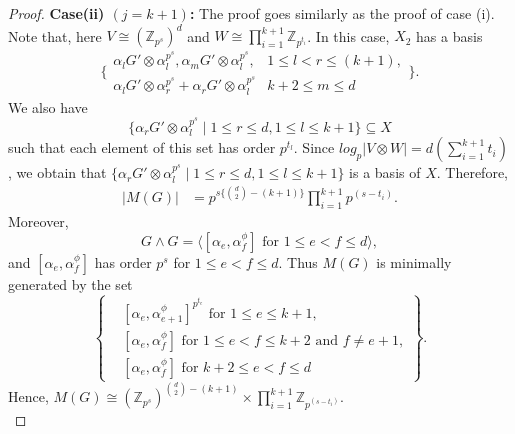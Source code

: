\documentclass[preprint,sort&compress,12pt]{elsarticle}
\numberwithin{equation}{section}
\theoremstyle{definition}
\newcommand{\Z}{\mathbb{Z}}
\begin{document}
\begin{proof}
\textbf{Case(ii) $(j=k+1)$:} The proof goes similarly as the proof of case (i). Note that, here $V \cong (\Z_{p^s})^d$ and $W \cong  \prod\limits_{i=1}^{k+1}\Z_{p^{t_i}}$. In this case, $X_2$ has a basis 
\[ \biggl\{ 
\begin{array}{l|cl}
\alpha_ l G' \otimes \alpha_l^{p^s},\alpha_mG' \otimes \alpha_l^{p^s}, &  1 \le l <r \le (k+1),  \\
	\alpha_ l G' \otimes \alpha_r^{p^s}+\alpha_ r G' \otimes \alpha_l^{p^s} & k+2 \le m \le d  
    \end{array}
\biggr\}.\]
We also have
$$\{\alpha_ r G' \otimes \alpha_l^{p^s} \mid 1 \le r \le d, 1\le l \le k+1\} \subseteq X$$
such that each element of this set has order $p^{t_l}.$
Since $log_p|V \otimes W|=d(\sum\limits_{i=1}^{k+1}t_i)$, we obtain that  $\{ \alpha_ r G' \otimes \alpha_l^{p^s} \mid 1 \le r \le d, 1\le l \le k+1 \}$ is a basis of $X$. Therefore, 
\begin{align*}
    |M(G)|%
          & = p^{s\{\binom{d}{2}-(k+1)\}} \prod_{i=1}^{k+1}p^{(s-t_i)}.
\end{align*}
Moreover,
    $$G \wedge G=\langle [\alpha_e,\alpha_f^{\phi}] \text{ for }  1\le e <f \le d \rangle,$$
and $[\alpha_e,\alpha_f^{\phi}]$ has order $p^s$ for $1\le e <f \le d$.
Thus $M(G)$ is minimally generated by the set
\[\left\{ 
    \begin{array}{cl} &  [\alpha_e,\alpha_{e+1}^{\phi}]^{p^{t_e}} \text{ for } 1 \le e \le k+1,\\
                 &  [\alpha_e,\alpha_f^{\phi}] \text{ for } 1 \le e < f \le k+2 \text{ and } f \neq e+1, \\
                 & [\alpha_e,\alpha_f^{\phi}] \text{ for } k+2 \le e < f \le d
    \end{array}
\right\}.\]
Hence, $M(G) \cong   (\Z_{p^s})^{\binom{d}{2}-(k+1)} \times \prod\limits_{i=1}^{k+1}\Z_{p^{(s-t_i)}}.$\\ 
\end{proof}
\end{document}
